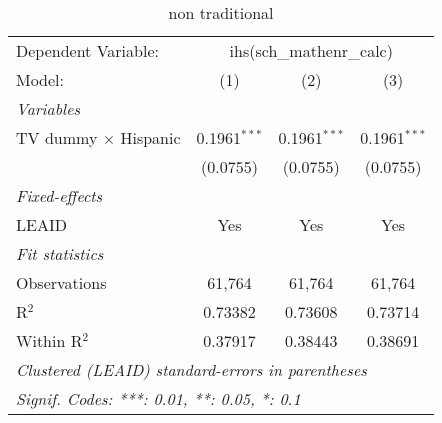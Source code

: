 \begin{table}[htbp]
\centering
\caption{non traditional}
\begin{tabular}{lccc}
\tabularnewline\midrule\midrule
Dependent Variable:&\multicolumn{3}{c}{ihs(sch\_mathenr\_calc)}\\
Model:&(1) & (2) & (3)\\
\midrule \emph{Variables}&   &   &  \\
TV dummy $\times$ Hispanic & 0.1961$^{***}$ & 0.1961$^{***}$ & 0.1961$^{***}$\\
  &(0.0755) & (0.0755) & (0.0755)\\
\midrule \emph{Fixed-effects}&   &   &  \\
LEAID & Yes & Yes & Yes\\
\midrule \emph{Fit statistics}&  & & \\
Observations & 61,764&61,764&61,764\\
R$^2$ & 0.73382&0.73608&0.73714\\
Within R$^2$ & 0.37917&0.38443&0.38691\\
\midrule\midrule\multicolumn{4}{l}{\emph{Clustered (LEAID) standard-errors in parentheses}}\\
\multicolumn{4}{l}{\emph{Signif. Codes: ***: 0.01, **: 0.05, *: 0.1}}\\
\end{tabular}
\end{table}

